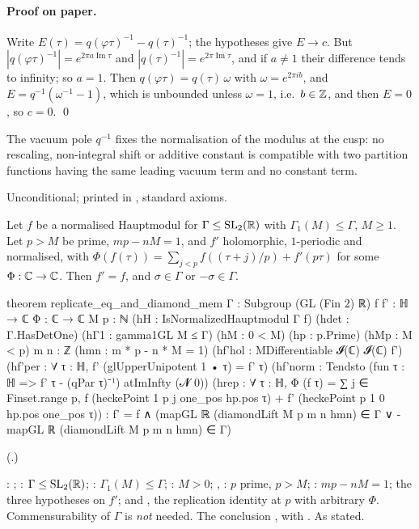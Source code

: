 \paragraph{Proof on paper.}  Write $E(\tau)=q(\varphi\tau)^{-1}-q(\tau)^{-1}$; the hypotheses give $E\to c$.  But
$|q(\varphi\tau)^{-1}|=e^{2\pi a\operatorname{Im}\tau}$ and $|q(\tau)^{-1}|=e^{2\pi\operatorname{Im}\tau}$, and if
$a\ne1$ their difference tends to infinity; so $a=1$.  Then $q(\varphi\tau)=q(\tau)\,\omega$ with $\omega=e^{2\pi ib}$,
and $E=q^{-1}(\omega^{-1}-1)$, which is unbounded unless $\omega=1$, i.e.\ $b\in{\mathbb{Z}}$, and then $E=0$, so $c=0$. \qed
\begin{physics}
The vacuum pole $q^{-1}$ fixes the normalisation of the modulus at the cusp: no rescaling, non-integral shift or
additive constant is compatible with two partition functions having the same leading vacuum term and no constant term.
\end{physics}
\begin{status}
Unconditional; printed in , standard axioms.
\end{status}

\begin{theorem}\label{ch16:thm:main}
Let $f$ be a normalised Hauptmodul for $\Gamma\le\mathrm{SL}_2(\mathbb{R})$ with $\Gamma_1(M)\le\Gamma$, $M\ge1$.  Let $p>M$ be prime,
$mp-nM=1$, and $f'$ holomorphic, $1$-periodic and normalised, with
$\Phi(f(\tau))=\sum_{j<p}f((\tau+j)/p)+f'(p\tau)$ for some $\Phi:{\mathbb{C}}\to{\mathbb{C}}$.  Then $f'=f$, and $\sigma\in\Gamma$ or
$-\sigma\in\Gamma$.
\end{theorem}
\begin{leancode}
theorem replicate_eq_and_diamond_mem {Γ : Subgroup (GL (Fin 2) ℝ)} {f f' : ℍ → ℂ}
    {Φ : ℂ → ℂ} {M p : ℕ} (hH : IsNormalizedHauptmodul Γ f) (hdet : Γ.HasDetOne)
    (hΓ1 : gamma1GL M ≤ Γ) (hM : 0 < M) (hp : p.Prime) (hMp : M < p) {m n : ℤ}
    (hmn : m * p - n * M = 1) (hf'hol : MDifferentiable 𝓘(ℂ) 𝓘(ℂ) f')
    (hf'per : ∀ τ : ℍ, f' (glUpperUnipotent 1 • τ) = f' τ)
    (hf'norm : Tendsto (fun τ : ℍ => f' τ - (qPar τ)⁻¹) atImInfty (𝓝 0))
    (hrep : ∀ τ : ℍ, Φ (f τ) = ∑ j ∈ Finset.range p, f (heckePoint 1 p j one_pos hp.pos τ) +
      f' (heckePoint p 1 0 hp.pos one_pos τ)) :
    f' = f ∧ (mapGL ℝ (diamondLift M p m n hmn) ∈ Γ ∨ -mapGL ℝ (diamondLift M p m n hmn) ∈ Γ)
\end{leancode}
(.)
\begin{dictionary}
: ; : $\Gamma\le\mathrm{SL}_2(\mathbb{R})$; : $\Gamma_1(M)\le\Gamma$;
: $M>0$; , : $p$ prime, $p>M$; : $mp-nM=1$; the three hypotheses on $f'$; and
, the replication identity at $p$ with arbitrary $\Phi$.  Commensurability of $\Gamma$ is \emph{not} needed.
The conclusion , with .  As stated.
\end{dictionary}
